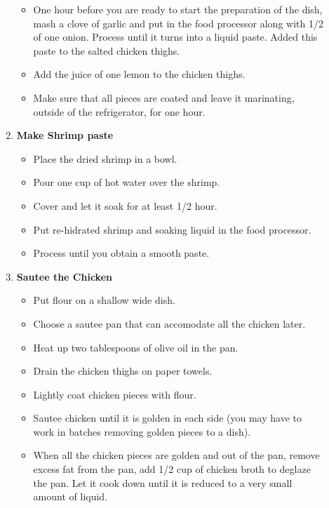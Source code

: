 \documentclass[11pt,letterpaper]{article}
\begin{document}
\begin{description}
\begin{enumerate}
	\begin{itemize}
        \item One hour before you are ready to start the preparation
          of the dish, mash a clove of garlic and put in the food
          processor along with 1/2 of one onion. Process until it
          turns into a liquid paste. Added this paste to the salted chicken
          thighs.
        \item Add the juice of one lemon to the chicken thighs.
        \item Make sure that all pieces are coated and leave it
          marinating, outside of the refrigerator, for one hour.
         \end{itemize}
        \item {\bf Make Shrimp paste}
	\begin{itemize}
        \item Place the dried shrimp in a bowl.
        \item Pour one cup of hot water over the shrimp.
        \item Cover and let it soak for at least 1/2 hour.
        \item Put re-hidrated shrimp and soaking liquid in the food processor.
        \item Process until you obtain a smooth paste.
         \end{itemize}
        \item {\bf Sautee the Chicken}
	\begin{itemize}
        \item Put flour on a shallow wide dish.
        \item Choose a sautee pan that can accomodate all the chicken later.
        \item Heat up two tablespoons of olive oil in the pan.
        \item Drain the chicken thighs on paper towels.        
        \item Lightly coat chicken pieces with flour.
        \item Sautee chicken until it is golden in each side (you may
          have to work in batches removing golden pieces to a dish).
        \item When all the chicken pieces are golden and out of the
          pan, remove excess fat from the pan, add 1/2 cup of chicken
          broth to deglaze the pan. Let it cook down until it is reduced to 
          a very small amount of liquid.
         \end{itemize}

\end{enumerate}
\end{description}
\end{document}
